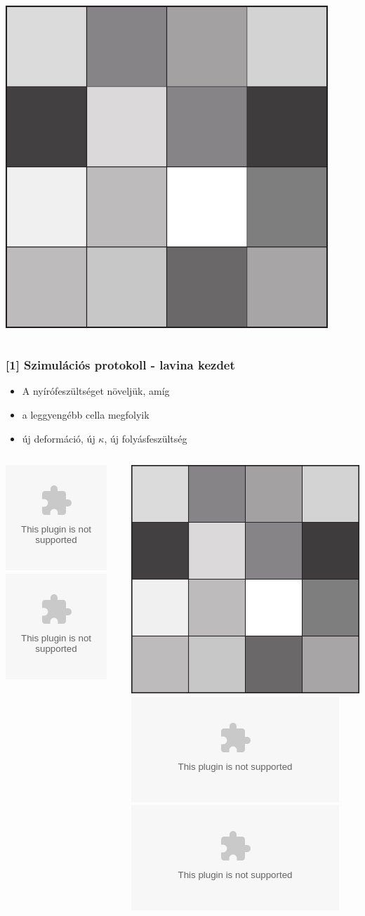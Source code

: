 \documentclass[12pt]{beamer}
\begin{document}
\begin{frame}
\begin{columns}
\begin{column}{0.5\textwidth}
\begin{center}
  \includegraphics[width=0.91\textwidth]{figs/mean_field_tau.eps}
  \end{center}
\end{column}
\end{columns}

\end{frame}


\begin{frame}
\frametitle{[1] Szimulációs protokoll - lavina kezdet}
\begin{itemize}
\item<1-> A nyírófeszültséget növeljük, amíg
\item<2-> a leggyengébb cella megfolyik
\item<3-> új deformáció, új $\kappa$, új folyásfeszültség
\end{itemize}

\begin{columns}
\begin{column}{0.5\textwidth}\begin{center}\includegraphics<1,2>[width=0.91\textwidth]{figs/mean_field_empty.eps}\includegraphics<3>[width=0.91\textwidth]{figs/mean_field_kappa_def1.eps}\end{center}\end{column}
\begin{column}{0.5\textwidth}\begin{center}\includegraphics<1>[width=0.91\textwidth]{figs/mean_field_tau.eps}\includegraphics<2>[width=0.91\textwidth]{figs/mean_field_tau_star.eps}\includegraphics<3>[width=0.91\textwidth]{figs/mean_field_tau_def1.eps}\end{center}\end{column}
\end{columns}

\end{frame}
\end{document}
